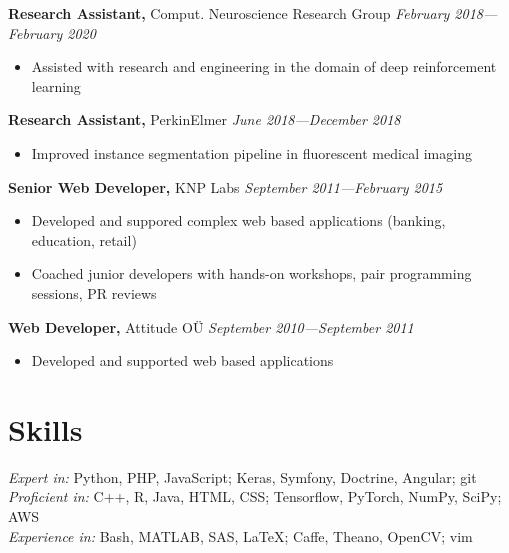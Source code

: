 \documentclass[margin,line]{res}
\begin{document}
\begin{resume}
{\bf Research Assistant,} Comput. Neuroscience Research Group \hfill {\it February 2018---February 2020}\\
\vspace*{-.15in}
\begin{itemize}
    \item[ ] Assisted with research and engineering in the domain of deep reinforcement learning
    \vspace*{-.05in}
\end{itemize}

{\bf Research Assistant,} PerkinElmer \hfill {\it June 2018---December 2018}\\
\vspace*{-.15in}
\begin{itemize}
    \item[ ] Improved instance segmentation pipeline in fluorescent medical imaging
    \vspace*{-.05in}
\end{itemize}

{\bf Senior Web Developer,} KNP Labs \hfill {\it September 2011---February 2015}\\
\vspace*{-.15in}
\begin{itemize}
    \item[ ] Developed and suppored complex web based applications (banking, education, retail)
    \vspace*{-.05in}
    \item[ ] Coached junior developers with hands-on workshops, pair programming sessions, PR reviews 
    \vspace*{-.05in}
\end{itemize}

{\bf Web Developer,} Attitude OÜ \hfill {\it September 2010---September 2011}\\
\vspace*{-.15in}
\begin{itemize}
    \item[ ] Developed and supported web based applications
    \vspace*{-.05in}
\end{itemize}


\section{\sc Skills}
{\it Expert in:} Python, PHP, JavaScript; Keras, Symfony, Doctrine, Angular; git
\vspace*{+.01in}\\
{\it Proficient in:} C++, R, Java, HTML, CSS; Tensorflow, PyTorch, NumPy, SciPy; AWS
\vspace*{+.01in}\\
{\it Experience in:} Bash, MATLAB, SAS, LaTeX; Caffe, Theano, OpenCV; vim


\end{resume}
\end{document}
